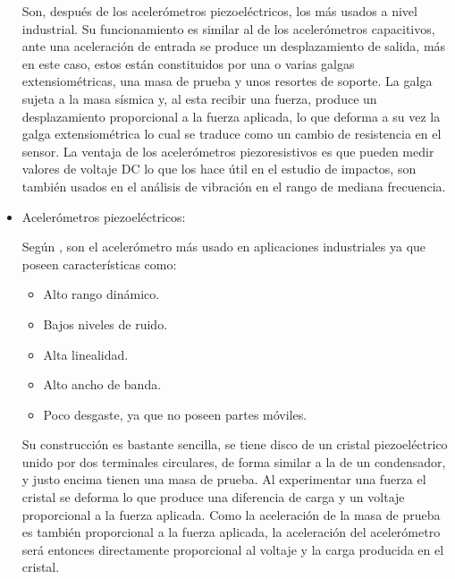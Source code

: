 \begin{itemize}
        Son, después de los acelerómetros piezoeléctricos, los más usados a nivel
        industrial. Su funcionamiento es similar al de los acelerómetros
        capacitivos, ante una aceleración de entrada se produce un desplazamiento
        de salida, más en este caso, estos están constituidos por una o varias
        galgas extensiométricas, una masa de prueba y unos resortes de soporte.
        La galga sujeta a la masa sísmica y, al esta recibir una fuerza, produce
        un desplazamiento proporcional a la fuerza aplicada, lo que deforma a
        su vez la galga extensiométrica lo cual se traduce como un
        cambio de resistencia en el sensor. La ventaja de los acelerómetros
        piezoresistivos es que pueden medir valores de voltaje DC lo que los
        hace útil en el estudio de impactos, son también usados en el
        análisis de vibración en el rango de mediana frecuencia.


    \item Acelerómetros piezoeléctricos:

        Según \cite{WeberPiezoelectricAT}, son el acelerómetro más usado en
        aplicaciones industriales ya que
        poseen características como:

        \begin{itemize}[noitemsep]
            \item Alto rango dinámico.
            \item Bajos niveles de ruido.
            \item Alta linealidad.
            \item Alto ancho de banda.
            \item Poco desgaste, ya que no poseen partes móviles.
        \end{itemize}


        Su construcción es bastante sencilla, se tiene disco de un cristal
        piezoeléctrico unido por dos terminales circulares, de forma similar a
        la de un condensador, y justo encima tienen una masa de prueba.
        Al experimentar una fuerza el cristal se deforma lo que produce una
        diferencia de carga y un voltaje proporcional a la fuerza aplicada.
        Como la aceleración de la masa de prueba es también proporcional a la
        fuerza aplicada, la aceleración del acelerómetro será entonces
        directamente proporcional al voltaje y la carga producida en el cristal.

\end{itemize}


